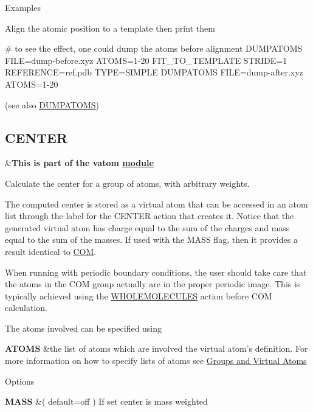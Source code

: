 \begin{DoxyParagraph}{Examples}

\end{DoxyParagraph}
Align the atomic position to a template then print them \begin{DoxyVerb}# to see the effect, one could dump the atoms before alignment
DUMPATOMS FILE=dump-before.xyz ATOMS=1-20
FIT_TO_TEMPLATE STRIDE=1 REFERENCE=ref.pdb TYPE=SIMPLE
DUMPATOMS FILE=dump-after.xyz ATOMS=1-20
\end{DoxyVerb}
 (see also \hyperlink{DUMPATOMS}{D\+U\+M\+P\+A\+T\+O\+M\+S}) \hypertarget{CENTER}{}\subsection{C\+E\+N\+T\+E\+R}\label{CENTER}
\begin{TabularC}{2}
\hline
&{\bfseries  This is part of the vatom \hyperlink{mymodules}{module }}   \\
\end{TabularC}
Calculate the center for a group of atoms, with arbitrary weights.

The computed center is stored as a virtual atom that can be accessed in an atom list through the label for the C\+E\+N\+T\+E\+R action that creates it. Notice that the generated virtual atom has charge equal to the sum of the charges and mass equal to the sum of the masses. If used with the M\+A\+S\+S flag, then it provides a result identical to \hyperlink{COM}{C\+O\+M}.

When running with periodic boundary conditions, the user should take care that the atoms in the C\+O\+M group actually are in the proper periodic image. This is typically achieved using the \hyperlink{WHOLEMOLECULES}{W\+H\+O\+L\+E\+M\+O\+L\+E\+C\+U\+L\+E\+S} action before C\+O\+M calculation.

\begin{DoxyParagraph}{The atoms involved can be specified using}

\end{DoxyParagraph}
\begin{TabularC}{2}
\hline
{\bfseries  A\+T\+O\+M\+S } &the list of atoms which are involved the virtual atom's definition. For more information on how to specify lists of atoms see \hyperlink{Group}{Groups and Virtual Atoms}   \\
\end{TabularC}


\begin{DoxyParagraph}{Options}

\end{DoxyParagraph}
\begin{TabularC}{2}
\hline
{\bfseries  M\+A\+S\+S } &( default=off ) If set center is mass weighted  

\\
\end{TabularC}


